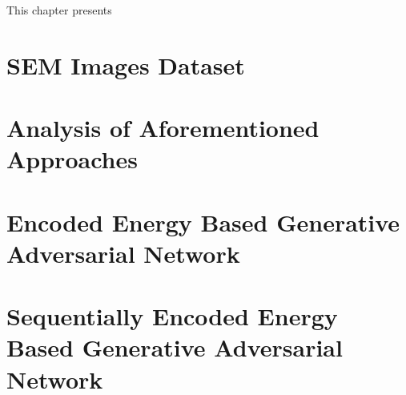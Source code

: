 
\begingroup

This chapter presents 

\section{SEM Images Dataset}

\section{Analysis of Aforementioned Approaches}

\section{Encoded Energy Based Generative Adversarial Network}

\section{Sequentially Encoded Energy Based Generative Adversarial Network}

\endgroup